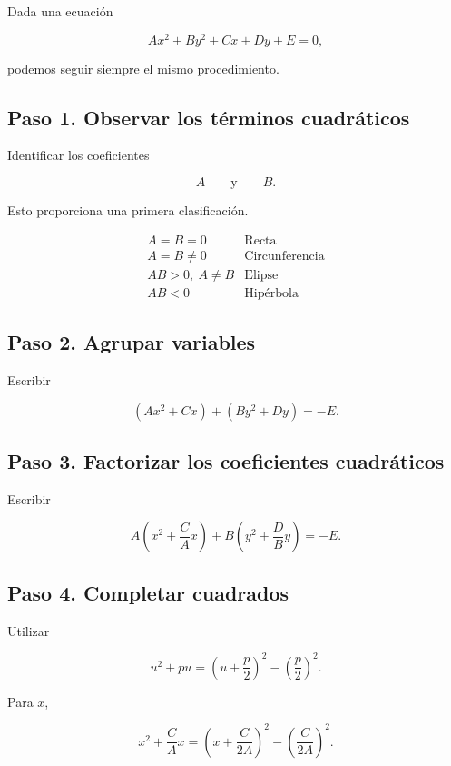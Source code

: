 \documentclass[12pt]{article}
\theoremstyle{plain}
\theoremstyle{definition}
\theoremstyle{remark}
\begin{document}
{Dada una ecuación

\[
Ax^2+By^2+Cx+Dy+E=0,
\]

podemos seguir siempre el mismo procedimiento.
\subsection*{Paso 1. Observar los términos cuadráticos}
Identificar los coeficientes

\[
A
\qquad\text{y}\qquad
B.
\]

Esto proporciona una primera clasificación.

\[
\begin{array}{c|c}
A=B=0 & \text{Recta}\\
A=B\neq0 & \text{Circunferencia}\\
AB>0,\ A\neq B & \text{Elipse}\\
AB<0 & \text{Hipérbola}
\end{array}
\]
\subsection*{Paso 2. Agrupar variables}
Escribir

\[
(Ax^2+Cx)+(By^2+Dy)=-E.
\]
\subsection*{Paso 3. Factorizar los coeficientes cuadráticos}
Escribir

\[
A\left(
x^2+\frac{C}{A}x
\right)
+
B\left(
y^2+\frac{D}{B}y
\right)
=
-E.
\]
\subsection*{Paso 4. Completar cuadrados}
Utilizar

\[
u^2+pu
=
\left(
u+\frac{p}{2}
\right)^2
-
\left(
\frac{p}{2}
\right)^2.
\]

Para \(x\),

\[
x^2+\frac{C}{A}x
=
\left(
x+\frac{C}{2A}
\right)^2
-
\left(
\frac{C}{2A}
\right)^2.
\]

}
\end{document}
